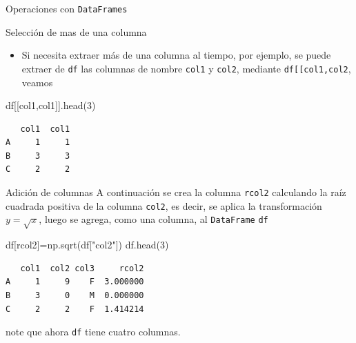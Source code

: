 \documentclass[
  ignorenonframetext,
  aspectratio=169,
  spanish,
]{beamer}
\newenvironment{Shaded}{\begin{snugshade}}{\end{snugshade}}
\newcommand{\DecValTok}[1]{\textcolor[rgb]{0.68,0.00,0.00}{#1}}
\newcommand{\NormalTok}[1]{\textcolor[rgb]{0.00,0.23,0.31}{#1}}
\newcommand{\OperatorTok}[1]{\textcolor[rgb]{0.37,0.37,0.37}{#1}}
\newcommand{\StringTok}[1]{\textcolor[rgb]{0.13,0.47,0.30}{#1}}
\providecommand{\tightlist}{%
  \setlength{\itemsep}{0pt}\setlength{\parskip}{0pt}}
\begin{document}
\begin{frame}[fragile]{Operaciones con \texttt{DataFrames}}
\begin{block}{Selección de mas de una columna}
\label{selecciuxf3n-de-mas-de-una-columna}
\begin{itemize}
\tightlist
\item
  Si necesita extraer más de una columna al tiempo, por ejemplo, se
  puede extraer de \texttt{df} las columnas de nombre \texttt{col1} y
  \texttt{col2}, mediante
  \texttt{df{[}{[}\textquotesingle{}col1\textquotesingle{},\textquotesingle{}col2\textquotesingle{}{]}{]}},
  veamos
\end{itemize}

\begin{Shaded}
\begin{Highlighting}[]
\NormalTok{df[[}\StringTok{\textquotesingle{}col1\textquotesingle{}}\NormalTok{,}\StringTok{\textquotesingle{}col1\textquotesingle{}}\NormalTok{]].head(}\DecValTok{3}\NormalTok{) }
\end{Highlighting}
\end{Shaded}

\begin{verbatim}
   col1  col1
A     1     1
B     3     3
C     2     2
\end{verbatim}
\end{block}

\begin{block}{Adición de columnas}
\label{adiciuxf3n-de-columnas}
A continuación se crea la columna \texttt{rcol2} calculando la raíz
cuadrada positiva de la columna \texttt{col2}, es decir, se aplica la
transformación \(y=\sqrt x\), luego se agrega, como una columna, al
\texttt{DataFrame} \texttt{df}

\begin{Shaded}
\begin{Highlighting}[]
\NormalTok{df[}\StringTok{\textquotesingle{}rcol2\textquotesingle{}}\NormalTok{]}\OperatorTok{=}\NormalTok{np.sqrt(df[}\StringTok{"col2"}\NormalTok{])}
\NormalTok{df.head(}\DecValTok{3}\NormalTok{)}
\end{Highlighting}
\end{Shaded}

\begin{verbatim}
   col1  col2 col3     rcol2
A     1     9    F  3.000000
B     3     0    M  0.000000
C     2     2    F  1.414214
\end{verbatim}

note que ahora \texttt{df} tiene cuatro columnas.
\end{block}


\end{frame}
\end{document}
